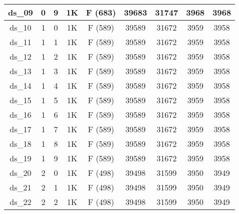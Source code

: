 \begin{footnotesize}
\begin{longtable}{|c|c|c|c|c|c|c|c|c|}
ds\_09      & 0           & 9           & 1K        & F (683)                     & 39683         & 31747          & 3968           & 3968          \\ \hline
ds\_10      & 1           & 0           & 1K        & F (589)                     & 39589         & 31672          & 3959           & 3958          \\ \hline
ds\_11      & 1           & 1           & 1K        & F (589)                     & 39589         & 31672          & 3959           & 3958          \\ \hline
ds\_12      & 1           & 2           & 1K        & F (589)                     & 39589         & 31672          & 3959           & 3958          \\ \hline
ds\_13      & 1           & 3           & 1K        & F (589)                     & 39589         & 31672          & 3959           & 3958          \\ \hline
ds\_14      & 1           & 4           & 1K        & F (589)                     & 39589         & 31672          & 3959           & 3958          \\ \hline
ds\_15      & 1           & 5           & 1K        & F (589)                     & 39589         & 31672          & 3959           & 3958          \\ \hline
ds\_16      & 1           & 6           & 1K        & F (589)                     & 39589         & 31672          & 3959           & 3958          \\ \hline
ds\_17      & 1           & 7           & 1K        & F (589)                     & 39589         & 31672          & 3959           & 3958          \\ \hline
ds\_18      & 1           & 8           & 1K        & F (589)                     & 39589         & 31672          & 3959           & 3958          \\ \hline
ds\_19      & 1           & 9           & 1K        & F (589)                     & 39589         & 31672          & 3959           & 3958          \\ \hline
ds\_20      & 2           & 0           & 1K        & F (498)                     & 39498         & 31599          & 3950           & 3949          \\ \hline
ds\_21      & 2           & 1           & 1K        & F (498)                     & 39498         & 31599          & 3950           & 3949          \\ \hline
ds\_22      & 2           & 2           & 1K        & F (498)                     & 39498         & 31599          & 3950           & 3949          \\ \hline

\end{longtable}
\end{footnotesize}
